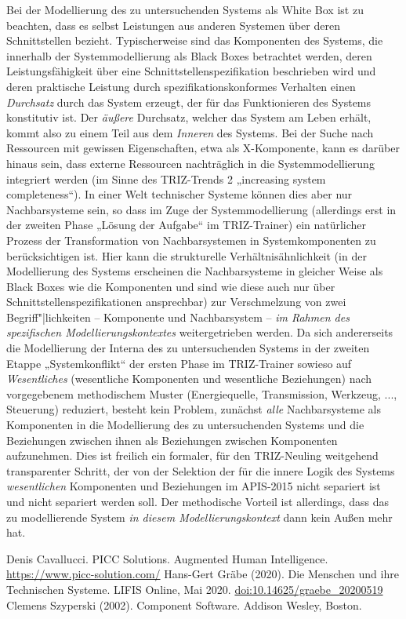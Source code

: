 \documentclass[11pt,a4paper]{article}
\begin{document}
Bei der Modellierung des zu untersuchenden Systems als White Box ist zu
beachten, dass es selbst Leistungen aus anderen Systemen über deren
Schnittstellen bezieht. Typischerweise sind das Komponenten des Systems, die
innerhalb der Systemmodellierung als Black Boxes betrachtet werden, deren
Leistungsfähigkeit über eine Schnittstellenspezifikation beschrieben wird und
deren praktische Leistung durch spezifikationskonformes Verhalten einen
\emph{Durchsatz} durch das System erzeugt, der für das Funktionieren des
Systems konstitutiv ist. Der \emph{äußere} Durchsatz, welcher das System am
Leben erhält, kommt also zu einem Teil aus dem \emph{Inneren} des Systems.
Bei der Suche nach Ressourcen mit gewissen Eigenschaften, etwa als
X-Komponente, kann es darüber hinaus sein, dass externe Ressourcen
nachträglich in die Systemmodellierung integriert werden (im Sinne des
TRIZ-Trends 2 „increasing system completeness“). In einer Welt technischer
Systeme können dies aber nur Nachbarsysteme sein, so dass im Zuge der
Systemmodellierung (allerdings erst in der zweiten Phase „Lösung der Aufgabe“
im TRIZ-Trainer) ein natürlicher Prozess der Transformation von
Nachbarsystemen in Systemkomponenten zu berücksichtigen ist. Hier kann die
strukturelle Verhältnisähnlichkeit (in der Modellierung des Systems erscheinen
die Nachbarsysteme in gleicher Weise als Black Boxes wie die Komponenten und
sind wie diese auch nur über Schnittstellenspezifikationen ansprechbar) zur
Verschmelzung von zwei Begriff"|lichkeiten -- Komponente und Nachbarsystem --
\emph{im Rahmen des spezifischen Modellierungskontextes} weitergetrieben
werden. Da sich andererseits die Modellierung der Interna des zu
untersuchenden Systems in der zweiten Etappe „Systemkonflikt“ der ersten Phase
im TRIZ-Trainer sowieso auf \emph{Wesentliches} (wesentliche Komponenten und
wesentliche Beziehungen) nach vorgegebenem methodischem Muster (Energiequelle,
Transmission, Werkzeug, ..., Steuerung) reduziert, besteht kein Problem,
zunächst \emph{alle} Nachbarsysteme als Komponenten in die Modellierung des zu
untersuchenden Systems und die Beziehungen zwischen ihnen als Beziehungen
zwischen Komponenten aufzunehmen.  Dies ist freilich ein formaler, für den
TRIZ-Neuling weitgehend transparenter Schritt, der von der Selektion der für
die innere Logik des Systems \emph{wesentlichen} Komponenten und Beziehungen
im APIS-2015 nicht separiert ist und nicht separiert werden soll.  Der
methodische Vorteil ist allerdings, dass das zu modellierende System \emph{in
  diesem Modellierungskontext} dann kein Außen mehr hat.



\begin{thebibliography}{xxx}
 Denis Cavallucci. PICC Solutions. Augmented Human
  Intelligence.  \url{https://www.picc-solution.com/}
 Hans-Gert Gräbe (2020). Die Menschen und ihre Technischen
  Systeme. LIFIS Online, Mai 2020. \url{doi:10.14625/graebe_20200519}
 Clemens Szyperski (2002). Component Software. Addison
  Wesley, Boston. 
\end{thebibliography}
\end{document}
